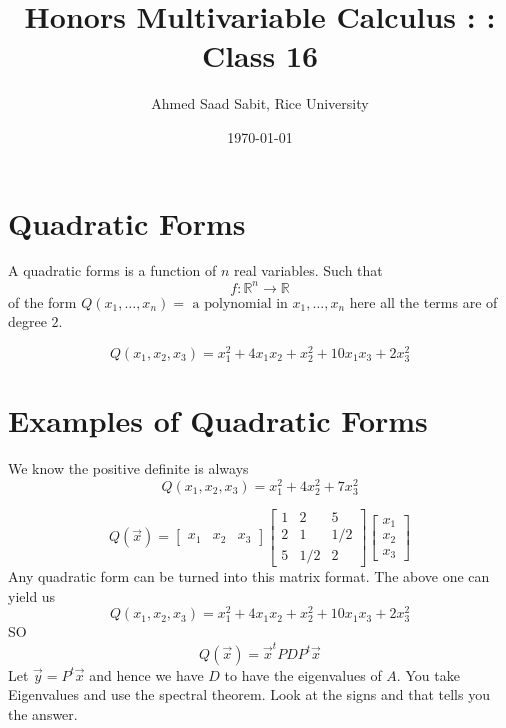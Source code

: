 \documentclass[letter]{article}
\title{Honors Multivariable Calculus : : Class 16}
\author{Ahmed Saad Sabit, Rice University}
\date{\today}
\begin{document}
\maketitle

\section*{Quadratic Forms} 
A quadratic forms is a function of $n$ real variables. Such that
\[
f: \mathbb{R}^{n} \to \mathbb{R}
\] 
of the form $Q(x_1, \ldots, x_n) = \text{ a polynomial in } x_1, \ldots, x_n$ here all the terms are of degree $2$. 

\[
Q(x_1,x_2,x_3) = 
x_1 ^2 + 
4x_1 x_2 + 
x_2^2 + 
10 x_1 x_3 + 2x_3^2
\]


\section*{Examples of Quadratic Forms} 
We know the positive definite is always 
\[
	Q(x_1, x_2, x_3) = x_1^2 + 4 x_2^2 + 7 x_3^2
\]


\[
Q(\vec{x}) = 
\begin{bmatrix} x_1 & x_2 & x_3 \end{bmatrix}
\begin{bmatrix} 1 & 2 & 5 \\ 
2 & 1 & 1 / 2 \\ 
5 & 1 / 2 & 2\end{bmatrix} 
\begin{bmatrix} x_1 \\ x_2 \\ x_3 \end{bmatrix} 
\] 
Any quadratic form can be turned into this matrix format. The above one can yield us 
\[
Q(x_1,x_2,x_3) = 
x_1 ^2 + 
4x_1 x_2 + 
x_2^2 + 
10 x_1 x_3 + 2x_3^2
\]
SO 
\[
Q(\vec{x}) = \vec{x}^{t} P D P ^{t} \vec{x}
\] 
Let $\vec{y} = P^{t} \vec{x}$ and hence we have $D $ to have the eigenvalues of $A$. You take Eigenvalues and use the spectral theorem. Look at the signs and that tells you the answer. 
\end{document}
